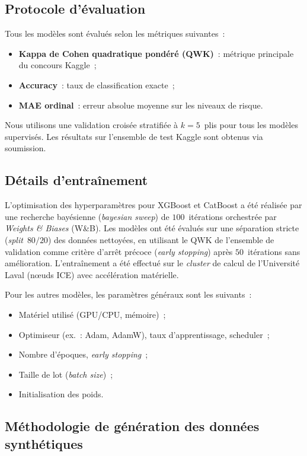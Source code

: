 \documentclass[conference]{IEEEtran}
\begin{document}
\subsection{Protocole d'évaluation}

Tous les modèles sont évalués selon les métriques suivantes~:
\begin{itemize}
  \item \textbf{Kappa de Cohen quadratique pondéré (QWK)}~: métrique principale du concours Kaggle~;
  \item \textbf{Accuracy}~: taux de classification exacte~;
  \item \textbf{MAE ordinal}~: erreur absolue moyenne sur les niveaux de risque.
\end{itemize}

Nous utilisons une validation croisée stratifiée à $k=5$~plis pour tous les modèles supervisés. Les résultats sur l'ensemble de test Kaggle sont obtenus via soumission.

\subsection{Détails d'entraînement}

L'optimisation des hyperparamètres pour XGBoost et CatBoost a été réalisée par une recherche bayésienne (\textit{bayesian sweep}) de $100$~itérations orchestrée par \textit{Weights \& Biases} (W\&B). Les modèles ont été évalués sur une séparation stricte (\textit{split}~$80/20$) des données nettoyées, en utilisant le QWK de l'ensemble de validation comme critère d'arrêt précoce (\textit{early stopping}) après $50$~itérations sans amélioration. L'entraînement a été effectué sur le \textit{cluster} de calcul de l'Université Laval (n\oe uds ICE) avec accélération matérielle.

Pour les autres modèles, les paramètres généraux sont les suivants~:
\begin{itemize}
  \item Matériel utilisé (GPU/CPU, mémoire)~;
  \item Optimiseur (ex.~: Adam, AdamW), taux d'apprentissage, scheduler~;
  \item Nombre d'époques, \textit{early stopping}~;
  \item Taille de lot (\textit{batch size})~;
  \item Initialisation des poids.
\end{itemize}


\subsection{Méthodologie de génération des données synthétiques}
\end{document}
